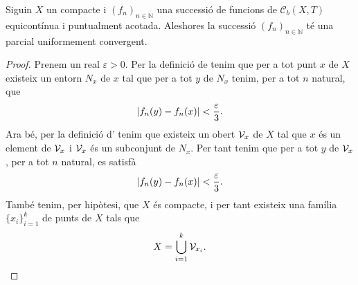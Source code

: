 \documentclass[../Apunts.tex]{subfiles}
\begin{document}
	\begin{lemma}
		\label{thm:Teorema d'Arzelà-Ascoli}
		Siguin \(X\) un compacte i \((f_{n})_{n\in\mathbb{N}}\) una successió de funcions de \(\mathcal{C}_{b}(X,T)\) equicontínua i puntualment acotada. Aleshores la successió \((f_{n})_{n\in\mathbb{N}}\) té una parcial uniformement convergent.
		\begin{proof}
			Prenem un real \(\varepsilon>0\). Per la definició de  tenim que per a tot punt \(x\) de \(X\) existeix un entorn \(N_{x}\) de \(x\) tal que per a tot \(y\) de \(N_{x}\) tenim, per a tot \(n\) natural, que
			\[\norm{f_{n}(y)-f_{n}(x)}<\frac{\varepsilon}{3}.\]
			Ara bé, per la definició d' tenim que existeix un obert \(\mathcal{V}_{x}\) de \(X\) tal que \(x\) és un element de \(\mathcal{V}_{x}\) i \(\mathcal{V}_{x}\) és un subconjunt de \(N_{x}\). Per tant tenim que per a tot \(y\) de \(\mathcal{V}_{x}\), per a tot \(n\) natural, es satisfà
			\begin{equation}
				\label{thm:Teorema d'Arzelà-Ascoli:eq2}
				\norm{f_{n}(y)-f_{n}(x)}<\frac{\varepsilon}{3}.
			\end{equation}
			També tenim, per hipòtesi, que \(X\) és compacte, i per tant existeix una família \(\{x_{i}\}_{i=1}^{k}\) de punts de \(X\) tals que
			\begin{equation}
				\label{thm:Teorema d'Arzelà-Ascoli:eq1}
				X=\bigcup_{i=1}^{k}\mathcal{V}_{x_{i}}.
			\end{equation}
			

\end{proof}
\end{lemma}
\end{document}
